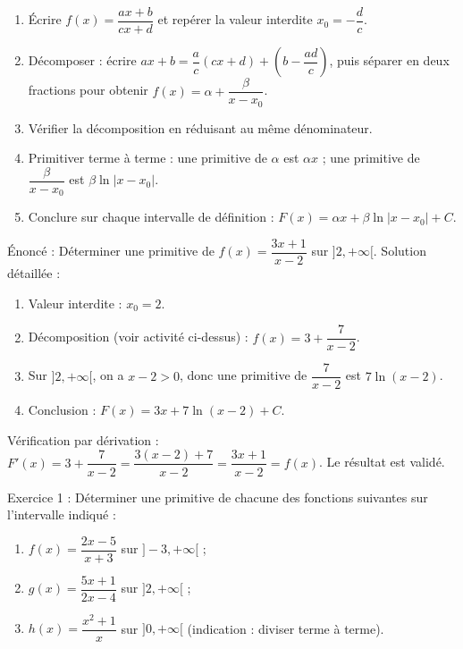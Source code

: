\documentclass[11pt]{article}
\begin{document}
\begin{methode}
\begin{enumerate}
\item Écrire $f(x) = \dfrac{ax+b}{cx+d}$ et repérer la valeur interdite $x_0 = -\dfrac{d}{c}$.
\item Décomposer : écrire $ax+b = \dfrac{a}{c}(cx+d) + \left(b - \dfrac{ad}{c}\right)$, puis séparer en deux fractions pour obtenir $f(x) = \alpha + \dfrac{\beta}{x-x_0}$.
\item Vérifier la décomposition en réduisant au même dénominateur.
\item Primitiver terme à terme : une primitive de $\alpha$ est $\alpha x$ ; une primitive de $\dfrac{\beta}{x-x_0}$ est $\beta\ln|x-x_0|$.
\item Conclure sur chaque intervalle de définition : $F(x) = \alpha x + \beta \ln|x-x_0| + C$.
\end{enumerate}
\end{methode}

\begin{exoresolu}
Énoncé : Déterminer une primitive de $f(x) = \dfrac{3x+1}{x-2}$ sur $]2, +\infty[$.
\tcblower
Solution détaillée :
\begin{enumerate}
\item Valeur interdite : $x_0 = 2$.
\item Décomposition (voir activité ci-dessus) : $f(x) = 3 + \dfrac{7}{x-2}$.
\item Sur $]2, +\infty[$, on a $x - 2 > 0$, donc une primitive de $\dfrac{7}{x-2}$ est $7\ln(x-2)$.
\item Conclusion : $F(x) = 3x + 7\ln(x-2) + C$.
\end{enumerate}
Vérification par dérivation : $F'(x) = 3 + \dfrac{7}{x-2} = \dfrac{3(x-2)+7}{x-2} = \dfrac{3x+1}{x-2} = f(x)$. Le résultat est validé.
\end{exoresolu}

\begin{exercice}[Entraînement]
Exercice 1 : Déterminer une primitive de chacune des fonctions suivantes sur l'intervalle indiqué :
\begin{enumerate}
\item $f(x) = \dfrac{2x-5}{x+3}$ sur $]-3, +\infty[$ ;
\item $g(x) = \dfrac{5x+1}{2x-4}$ sur $]2, +\infty[$ ;
\item $h(x) = \dfrac{x^2+1}{x}$ sur $]0, +\infty[$ (indication : diviser terme à terme).
\end{enumerate}
\end{exercice}
\end{document}
